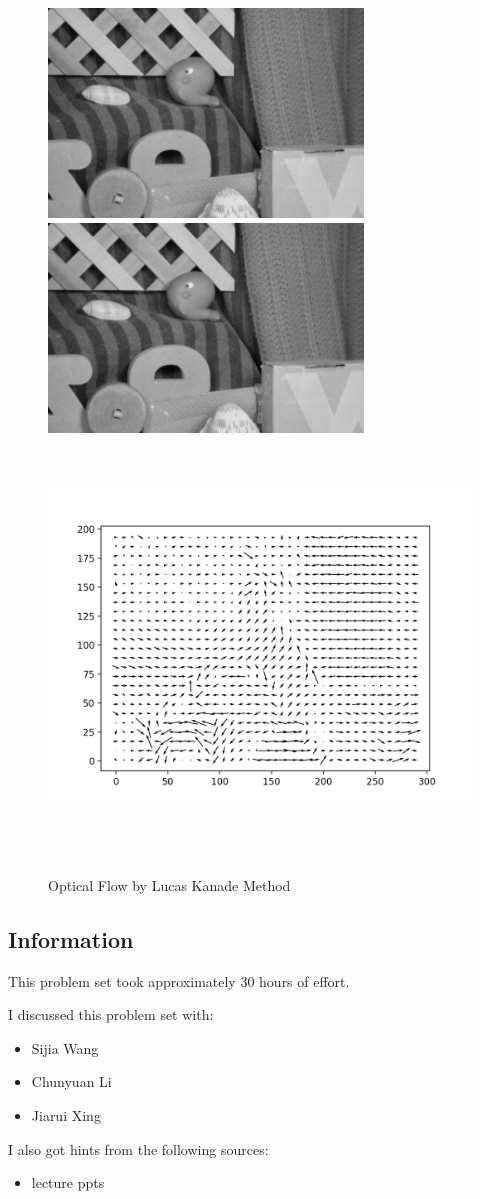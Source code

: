 \documentclass{article}
\newcommand{\info}{\clearpage \subsection*{Information}}
\begin{document}
\begin{figure}[h!]
  \centering
	\includegraphics[height=15em]{code/inputs/frame10.jpg}
	\includegraphics[height=15em]{code/inputs/frame11.jpg}
	\includegraphics[height=30em]{code/outputs/prob4.png}
	  \caption{Optical Flow by Lucas Kanade Method}
\end{figure}

\info

This problem set took approximately 30 hours of effort.

I discussed this problem set with:
\begin{itemize}
\item Sijia Wang
\item Chunyuan Li
\item Jiarui Xing
\end{itemize}

I also got hints from the following sources:
\begin{itemize}
\item lecture ppts
\end{itemize}
\end{document}
